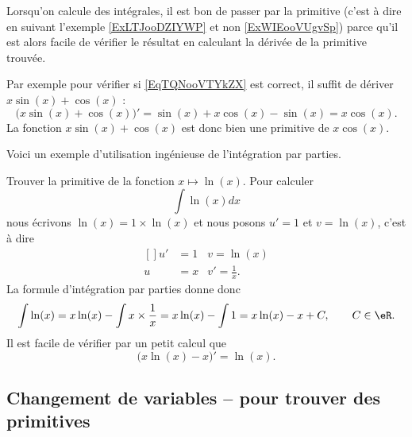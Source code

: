 \begin{remark}
    Lorsqu'on calcule des intégrales, il est bon de passer par la primitive (c'est à dire en suivant l'exemple \ref{ExLTJooDZIYWP} et non \ref{ExWIEooVUgvSp}) parce qu'il est alors facile de vérifier le résultat en calculant la dérivée de la primitive trouvée.
     
    Par exemple pour vérifier si \eqref{EqTQNooVTYkZX} est correct, il suffit de dériver \( x\sin(x)+\cos(x)\) :
    \begin{equation}
        \big( x\sin(x)+\cos(x) \big)'=\sin(x)+x\cos(x)-\sin(x)=x\cos(x).
    \end{equation}
    La fonction \( x\sin(x)+\cos(x)\) est donc bien une primitive de \( x\cos(x)\).
\end{remark}

Voici un exemple d'utilisation ingénieuse de l'intégration par parties.

\begin{example}\label{primln}
    Trouver la primitive de la fonction \( x\mapsto \ln(x)\). Pour calculer
    \begin{equation}
        \int\ln(x)dx
    \end{equation}
    nous écrivons \( \ln(x)=1\times \ln(x)\) et nous posons \( u'=1\) et \( v=\ln(x)\), c'est à dire
    \begin{equation}
        \begin{aligned}[]
            u'&=1&v=\ln(x)\\
            u&=x&v'=\frac{1}{ x }.
        \end{aligned}
    \end{equation}
    La formule d'intégration par parties donne donc 
    \begin{equation}
        \int \ln(x)=x\ln(x)-\int x\times \frac{1}{ x }=x\ln(x)-\int 1=x\ln(x)-x+C, \qquad C\in\eR.
    \end{equation}
    Il est facile de vérifier par un petit calcul que
    \begin{equation}
        \big( x\ln(x)-x \big)'=\ln(x).
    \end{equation}
\end{example}

\subsection{Changement de variables -- pour trouver des primitives}

